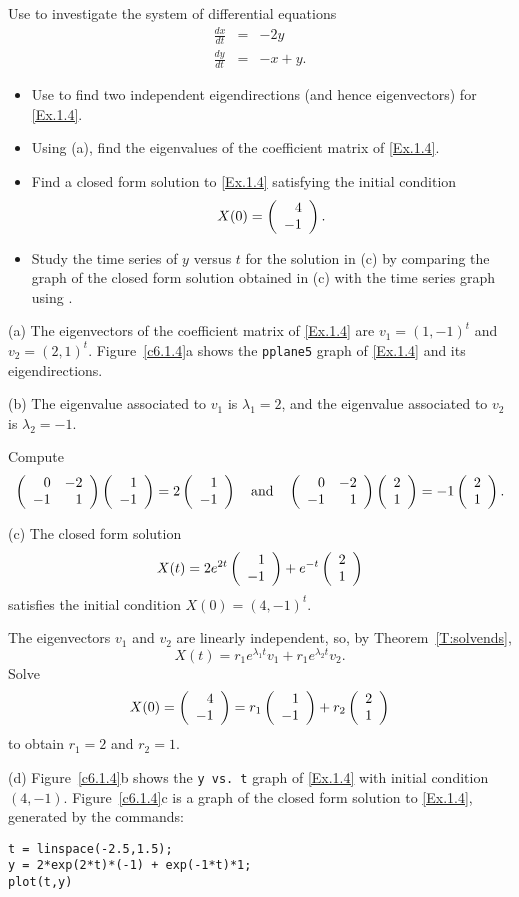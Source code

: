 \documentclass{ximera}
\begin{document}
\begin{exercise} \label{c6.1.4}
Use {\pplane} to investigate the system
of differential equations
\begin{equation}  \label{Ex.1.4}
\begin{array}{rcr}
\frac{dx}{dt}  & = & -2y \\
\frac{dy}{dt}  & = &  -x+y.
\end{array}
\end{equation}
\begin{itemize}
\item[(a)] Use {\pplane} to find two independent eigendirections (and
hence eigenvectors) for \eqref{Ex.1.4}.
\item[(b)] Using (a), find the eigenvalues of the coefficient matrix of
\eqref{Ex.1.4}.
\item[(c)] Find a closed form solution to \eqref{Ex.1.4} satisfying the initial
condition
\[
X(0) = \left(\begin{array}{r} 4 \\ -1\end{array}\right).
\]
\item[(d)] Study the time series of $y$ versus $t$ for the solution in (c)
by comparing the graph of the closed form solution obtained in (c) with the
time series graph using {\pplane}.
\end{itemize}

\begin{solution}

(a) The eigenvectors of the coefficient matrix of \eqref{Ex.1.4} are
$v_1 = (1,-1)^t$ and $v_2 = (2,1)^t$.  Figure~\ref{c6.1.4}a shows
the {\tt pplane5} graph of \eqref{Ex.1.4} and its eigendirections.

(b) \ans The eigenvalue associated to $v_1$ is $\lambda_1 = 2$, and
the eigenvalue associated to $v_2$ is $\lambda_2 = -1$. 

\soln Compute
\[ \left(\begin{array}{rr} 0 & -2\\ -1 &1\end{array}\right)\left(\begin{array}{r} 1 \\ -1\end{array}\right) = 2\left(\begin{array}{r} 1 \\ -1\end{array}\right) \quad\mbox{and}\quad
\left(\begin{array}{rr} 0 & -2\\ -1 &1\end{array}\right)\left(\begin{array}{r} 2 \\ 1\end{array}\right) =  -1\left(\begin{array}{r} 2 \\ 1\end{array}\right). \]

(c) \ans The closed form solution
\[
X(t) = 2e^{2t}\left(\begin{array}{r} 1 \\ -1\end{array}\right) + e^{-t}\left(\begin{array}{r} 2 \\ 1\end{array}\right)
\]
satisfies the initial condition $X(0) = (4,-1)^t$.

\soln The eigenvectors $v_1$ and $v_2$ are linearly independent, so, by 
Theorem~\ref{T:solvends},
\[
X(t) = r_1e^{\lambda_1t}v_1 + r_1e^{\lambda_2t}v_2.
\]
Solve
\[
X(0) = \left(\begin{array}{r} 4 \\ -1\end{array}\right) = r_1\left(\begin{array}{r} 1 \\ -1\end{array}\right) + r_2\left(\begin{array}{r} 2 \\ 1\end{array}\right)
\]
to obtain $r_1 = 2$ and $r_2 = 1$.

(d) Figure~\ref{c6.1.4}b shows the {\tt y vs.\ t} graph of \eqref{Ex.1.4}
with initial condition $(4,-1)$.  Figure~\ref{c6.1.4}c is a graph of 
the closed form solution to \eqref{Ex.1.4}, generated by the \Matlab
commands:
\begin{verbatim}
t = linspace(-2.5,1.5);
y = 2*exp(2*t)*(-1) + exp(-1*t)*1;
plot(t,y)
\end{verbatim}


\end{solution}
\end{exercise}
\end{document}
